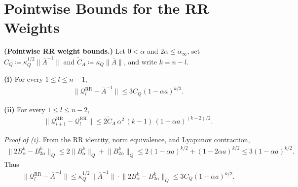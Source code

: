 
\section{Pointwise Bounds for the RR Weights}

\begin{lemma}\label{lem:RR-weight-pointwise}
  \textbf{(Pointwise RR weight bounds.)}
  Let \(0 < \alpha\) and \(2 \alpha \le \alpha_\infty\), set \(C_Q \coloneqq \kappa_Q^{1 / 2} \lVert  \overline{A}^{-1}  \rVert\) and \(\widetilde{C}_A \coloneqq \kappa_Q \lVert  \overline{A}  \rVert\), and write \(k = n - l\).

  \textbf{(i)} For every \(1 \le l \le n - 1\),
\begin{equation}
\begin{aligned}
\lVert  \mathcal{Q}_l^{\text{RR}} - \overline{A}^{-1}  \rVert \le 3 C_Q (1 - \alpha a)^{k / 2}.
\end{aligned}
\end{equation}

  \textbf{(ii)} For every \(1 \le l \le n - 2\),
\begin{equation}
\begin{aligned}
  \lVert  \mathcal{Q}_{l + 1}^{\text{RR}} - \mathcal{Q}_l^{\text{RR}}  \rVert
    \le 2 \widetilde{C}_A \, \alpha^2 \, (k - 1) \, (1 - \alpha a)^{(k - 2) / 2}.
\end{aligned}
\end{equation}
\end{lemma}

\textit{Proof of (i).} From the RR identity, norm equivalence, and Lyapunov
contraction,
\begin{equation}
\begin{aligned}
\lVert  2 B_\alpha^k - B_{2 \alpha}^k  \rVert_Q
  \le 2 \lVert  B_\alpha^k  \rVert_Q + \lVert  B_{2 \alpha}^k  \rVert_Q
  \le 2 (1 - \alpha a)^{k / 2} + (1 - 2 \alpha a)^{k / 2}
  \le 3 (1 - \alpha a)^{k / 2}.
\end{aligned}
\end{equation}
Thus
\begin{equation}
\begin{aligned}
\lVert  \mathcal{Q}_l^{\text{RR}} - \overline{A}^{-1}  \rVert
  \le \kappa_Q^{1 / 2} \lVert  \overline{A}^{-1}  \rVert \cdot \lVert  2 B_\alpha^k - B_{2 \alpha}^k  \rVert_Q
  \le 3 C_Q (1 - \alpha a)^{k / 2}.
\end{aligned}
\end{equation}

